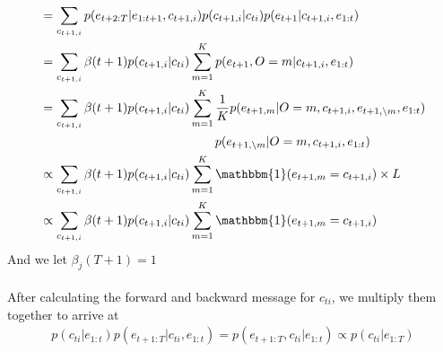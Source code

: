 \documentclass[12pt]{article}
\begin{document}
\begin{enumerate}[label=(\alph*)]
\begin{align*}
			&= \sum_{c_{t+1, i}} p(e_{t+2:T}|e_{1:t+1},c_{t+1,i})p(c_{t+1,i}|c_{ti})p(e_{t+1}|c_{t+1, i}, e_{1:t}) \\
			&= \sum_{c_{t+1, i}}\beta(t + 1)p(c_{t+1,i}|c_{ti})\sum_{m=1}^K p(e_{t+1}, O=m|c_{t+1,i},e_{1:t}) \\ 
			&= \sum_{c_{t+1, i}}\beta(t + 1)p(c_{t+1,i}|c_{ti})\sum_{m=1}^K \frac{1}{K}p(e_{t+1,m}|O=m,c_{t+1,i}, e_{t+1,\setminus m}, e_{1:t})\\
			&\qquad \qquad \qquad \qquad \qquad \qquad \qquad p(e_{t+1,\setminus m}|O=m, c_{t+1,i}, e_{1:t}) \\
			&\propto \sum_{c_{t+1, i}}\beta(t + 1)p(c_{t+1,i}|c_{ti})\sum_{m=1}^K \mathbbm{1}(e_{t+1,m}=c_{t+1, i}) \times L \\
			&\propto \sum_{c_{t+1, i}}\beta(t + 1)p(c_{t+1,i}|c_{ti})\sum_{m=1}^K \mathbbm{1}(e_{t+1,m}=c_{t+1, i}) \\
		\end{align*}
		And we let $\beta_j(T + 1) = 1$ \\ \\
		After calculating the forward and backward message for $c_{ti}$, we multiply them together to arrive at
		\begin{align*}
			p(c_{ti}|e_{1:t})p(e_{t+1:T}|c_{ti}, e_{1:t}) = p(e_{t+1:T}, c_{ti}|e_{1:t}) \propto p(c_{ti}|e_{1:T}) 
		\end{align*}
\end{enumerate}
\end{document}
